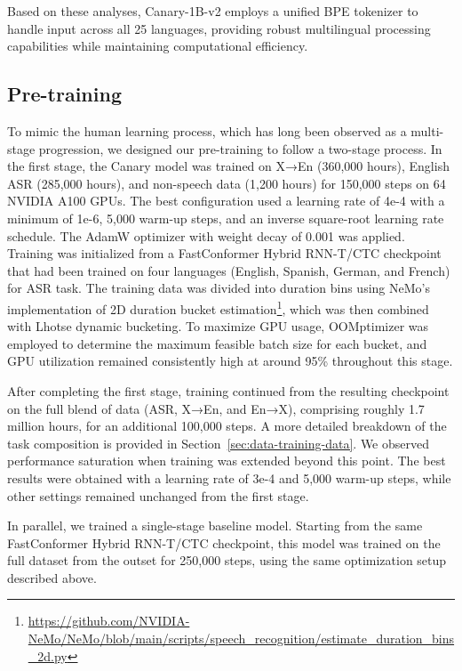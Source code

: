 Based on these analyses, Canary-1B-v2 employs a unified BPE tokenizer\cite{bpe-tokenizer} to handle input across all 25 languages, providing robust multilingual processing capabilities while maintaining computational efficiency.


\subsection{Pre-training}

To mimic the human learning process, which has long been observed as a multi-stage progression, we designed our pre-training to follow a two-stage process. In the first stage, the Canary model was trained on X→En (360,000 hours), English ASR (285,000 hours), and non-speech data (1,200 hours) for 150,000 steps on 64 NVIDIA A100 GPUs. The best configuration used a learning rate of 4e-4 with a minimum of 1e-6, 5,000 warm-up steps, and an inverse square-root learning rate schedule\cite{attention}. The AdamW optimizer\cite{adamw} with weight decay of 0.001 was applied. Training was initialized from a FastConformer Hybrid RNN-T/CTC checkpoint that had been trained on four languages (English, Spanish, German, and French) for ASR task. The training data was divided into duration bins using NeMo’s implementation of 2D duration bucket estimation\footnote{\url{https://github.com/NVIDIA-NeMo/NeMo/blob/main/scripts/speech_recognition/estimate_duration_bins_2d.py}}, which was then combined with Lhotse dynamic bucketing. To maximize GPU usage, OOMptimizer\cite{oomptimizer} was employed to determine the maximum feasible batch size for each bucket, and GPU utilization remained consistently high at around 95\% throughout this stage.

After completing the first stage, training continued from the resulting checkpoint on the full blend of data (ASR, X→En, and En→X), comprising roughly 1.7 million hours, for an additional 100,000 steps. A more detailed breakdown of the task composition is provided in Section~\ref{sec:data-training-data}. We observed performance saturation when training was extended beyond this point. The best results were obtained with a learning rate of 3e-4 and 5,000 warm-up steps, while other settings remained unchanged from the first stage.

In parallel, we trained a single-stage baseline model. Starting from the same FastConformer Hybrid RNN-T/CTC checkpoint, this model was trained on the full dataset from the outset for 250,000 steps, using the same optimization setup described above.


